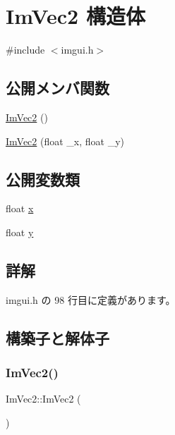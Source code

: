 \hypertarget{struct_im_vec2}{}\section{Im\+Vec2 構造体}
\label{struct_im_vec2}


{\ttfamily \#include $<$imgui.\+h$>$}

\subsection*{公開メンバ関数}
\begin{DoxyCompactItemize}
\item 
\mbox{\hyperlink{struct_im_vec2_a5dfa5ab27cc4af6df3cf8d920fc8a294}{Im\+Vec2}} ()
\item 
\mbox{\hyperlink{struct_im_vec2_af2fd51a6c4bf6290676b235533b92c0d}{Im\+Vec2}} (float \+\_\+x, float \+\_\+y)
\end{DoxyCompactItemize}
\subsection*{公開変数類}
\begin{DoxyCompactItemize}
\item 
float \mbox{\hyperlink{struct_im_vec2_a5802a68560961ed8cb8cc5fb2a244c2d}{x}}
\item 
float \mbox{\hyperlink{struct_im_vec2_a1f9d136ca837e147b793b19d25a3a618}{y}}
\end{DoxyCompactItemize}


\subsection{詳解}


 imgui.\+h の 98 行目に定義があります。



\subsection{構築子と解体子}
\mbox{\label{struct_im_vec2_a5dfa5ab27cc4af6df3cf8d920fc8a294}} 
\subsubsection{\texorpdfstring{Im\+Vec2()}{ImVec2()}\hspace{0.1cm}{\footnotesize\ttfamily [1/2]}}
{\footnotesize\ttfamily Im\+Vec2\+::\+Im\+Vec2 (\begin{DoxyParamCaption}{ }\end{DoxyParamCaption})\hspace{0.3cm}{\ttfamily [inline]}}



